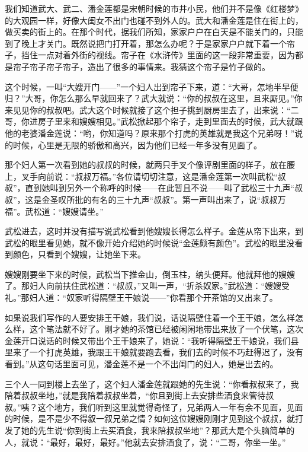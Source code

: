 \par 我们知道武大、武二、潘金莲都是宋朝时候的市井小民，他们并不是像《红楼梦》的大观园一样，好像大闺女不出门也碰不到外人的。武大和潘金莲是住在街上的，做买卖的街上的。在那个时代，据我们所知，家家户户在白天是不能关门的，只能到了晚上才关门。既然说把门打开着，那怎么办呢？于是家家户户就下着一个帘子，挡住一点对着外街的视线。帘子在《水浒传》里面的这一段非常重要，因为都是帘子帘子帘子帘子，造出了很多的事情来。我猜这个帘子是竹子做的。
\par 这个时候，一叫“大嫂开门——”一个妇人出到帘子下来，道：“大哥，怎地半早便归？”大哥，你怎么那么早就回来了？武大就说：“你的叔叔在这里，且来厮见。”你来见见你的叔叔吧。武大这个时候就接了这个担子挑到厨房里去了，出来说：“二哥，你进房子里来和嫂嫂相见。”武松掀起那个帘子，走到里面去的时候，武大就跟他的老婆潘金莲说：“哟，你知道吗？原来那个打虎的英雄就是我这个兄弟呀！”说的时候，心里是无限的骄傲和高兴，因为他们已经一年多没有见面了。
\par 那个妇人第一次看到她的叔叔的时候，就两只手叉个像评剧里面的样子，放在腰上，叉手向前说：“叔叔万福。”各位请切切注意，这是潘金莲第一次叫武松“叔叔”，直到她叫到另外一个称呼的时候——在此暂且不说——叫了武松三十九声“叔叔”，这是金圣叹所批的有名的三十九声“叔叔”。第一声叫出来了，说“叔叔万福”。武松道：“嫂嫂请坐。”
\par 武松进去，这时并没有描写说武松看到他嫂嫂长得怎么样子。金莲从帘下出来，到武松的眼里看见她，就不像开始介绍她的时候说“金莲颇有颜色”。武松的眼里没看到颜色，只看到个嫂嫂，让她坐下来。
\par 嫂嫂刚要坐下来的时候，武松当下推金山，倒玉柱，纳头便拜。他就拜他的嫂嫂了。那妇人向前扶住武松道：“叔叔，”又叫一声，“折杀奴家。”武松道：“嫂嫂受礼。”那妇人道：“奴家听得隔壁王干娘说——”你看那个开茶馆的又出来了。
\par 如果说我们写作的人要安排王干娘，我们说，话说隔壁住着一个王干娘，怎么样怎么样，这个笔法就不好了。刚才她的茶馆已经被闲闲地带出来放了一个伏笔，这次金莲开口说话的时候又带出个王干娘来了，她说：“我听得隔壁王干娘说，我们县里来了一个打虎英雄，我跟王干娘就要跑去看，我们去的时候不巧赶得迟了，没有看到。”从这句话里面可见，潘金莲不是一个不出闺门的妇人，她是出去的。
\par 三个人一同到楼上去坐了，这个妇人潘金莲就跟她的先生说：“你看叔叔来了，我陪着叔叔坐地，”就是我陪着叔叔坐着，“你且到街上去安排些酒食来管待叔叔。”咦？这个地方，我们听到这里就觉得奇怪了，兄弟两人一年有余不见面，见面的时候，是不是少不得叙一叙兄弟之情？如何这位嫂嫂刚刚才见到这个叔叔，就打发了她的先生说“你到街上去买酒食，我来陪叔叔坐地”？那武大是个头脑简单的人，就说：“最好，最好，最好。”他就去安排酒食了，说：“二哥，你坐一坐。”
